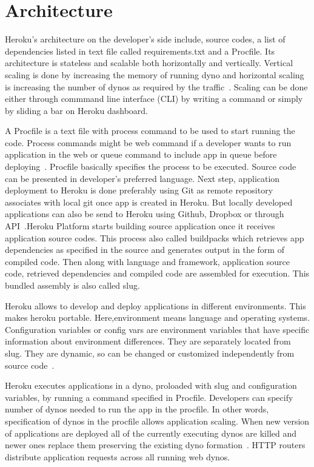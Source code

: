  \section{Architecture}

 Heroku's architecture on the developer's side include, source codes, a list of
 dependencies listed in text file called requirements.txt and a Procfile. Its
 architecture is stateless and scalable both horizontally and vertically.
 Vertical scaling is done by increasing the memory of running dyno and
 horizontal scaling is increasing the number of dynos as required by
 the traffic~\cite{hid-sp18-415-www-python-heroku-com}. Scaling can be done either
 through commmand line interface (CLI) by writing a command or simply
 by sliding a bar on Heroku dashboard. 

 A Procfile is a text file with 
 process command to be used to start running the code. Process commands might
 be web command if a developer wants to run application in the web or queue
 command to include app in queue before deploying~\cite{hid-sp18-415-www-how-heroku-works}.
 Procfile basically specifies the process to be executed.
 Source code can be presented in developer's preferred language.
 Next step, application deployment to Heroku is done preferably using Git
 as remote repository associates with local git  once app is created in Heroku.
 But locally developed applications can also be send to Heroku using Github,
 Dropbox or through API~\cite{hid-sp18-415-www-how-heroku-works}.Heroku Platform starts 
 building source application once it receives application source codes. This 
 process also called buildpacks which retrieves app dependencies as specified 
 in the source and generates output in the form of compiled code. Then along
 with language and framework, application source code, retrieved dependencies
 and compiled code are assembled for execution. This bundled assembly is also
 called slug.

 Heroku allows to develop and deploy applications in different environments.
 This makes heroku portable. Here,environment means language and operating
 systems. Configuration variables or config vars are environment variables
 that have specific information about environment differences. They are
 separately located from slug. They are dynamic, so can be changed or
 customized independently from source code~\cite{hid-sp18-415-www-how-heroku-works}.

 Heroku executes applications in a dyno, proloaded with slug and configuration
 variables, by running a command specified in Procfile. Developers can specify
 number of dynos needed to run the app in the procfile. In other words,
 specification of dynos in the procfile allows application scaling. When new
 version of applications are deployed all of the currently executing dynos are
 killed and newer ones replace them preserving the existing dyno
 formation~\cite{hid-sp18-415-www-how-heroku-works}. HTTP routers distribute application
 requests across all running web dynos. 


